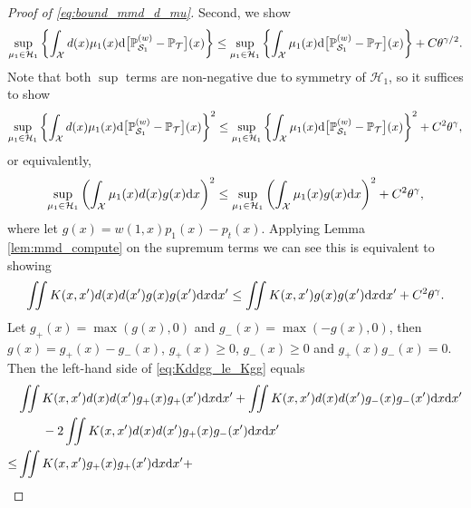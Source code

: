 \documentclass[12pt]{article}
\newcommand{\prob}{\mathbb{P}}
\begin{document}
\begin{proof}[Proof of \eqref{eq:bound_mmd_d_mu}]
	Second, we show 
	{\small
		\begin{equation}
			\label{eq:dmu_le_mu_population}
			\sup_{\mu_1 \in \mathcal{H}_1}
			\left\{ \int_\mathcal{X} d(x) \mu_1(x) \textnormal{d} \big[\prob_{\mathcal{S}_1}^{(w)} - \prob_{\mathcal{T}}\big](x) \right\}
			\le
			\sup_{\mu_1 \in \mathcal{H}_1}
			\left\{ \int_\mathcal{X} \mu_1(x) \textnormal{d} \big[\prob_{\mathcal{S}_1}^{(w)} - \prob_{\mathcal{T}}\big](x) \right\} + C \theta^{\gamma/2}
			.\end{equation}
	}%
	Note that both $\sup$ terms are non-negative due to symmetry of $\mathcal{H}_1$, so it suffices to show
	\begin{equation*}
		\sup_{\mu_1 \in \mathcal{H}_1}
		\left\{ \int_\mathcal{X} d(x) \mu_1(x) \textnormal{d} \big[\prob_{\mathcal{S}_1}^{(w)} - \prob_{\mathcal{T}}\big](x) \right\}^2
		\le
		\sup_{\mu_1 \in \mathcal{H}_1}
		\left\{ \int_\mathcal{X} \mu_1(x) \textnormal{d} \big[\prob_{\mathcal{S}_1}^{(w)} - \prob_{\mathcal{T}}\big](x) \right\}^2 + C^2 \theta^{\gamma}
		,\end{equation*}
	or equivalently,
	\begin{equation*}
		\sup_{\mu_1 \in \mathcal{H}_1}
		\left( \int_\mathcal{X} \mu_1(x) d(x) g(x) \textnormal{d} x \right)^2
		\le
		\sup_{\mu_1 \in \mathcal{H}_1}
		\left( \int_\mathcal{X} \mu_1(x) g(x) \textnormal{d} x \right)^2 + C^2 \theta^{\gamma}
		,\end{equation*}
	where let $g(x) = w(1,x)p_1(x) - p_t(x)$.
	Applying Lemma \ref{lem:mmd_compute} on the supremum terms we can see this is equivalent to showing
	\begin{equation}
		\label{eq:Kddgg_le_Kgg}
		\iint K(x, x') d(x) d(x') g(x) g(x') \textnormal{d} x \textnormal{d} x'
		\le
		\iint K(x, x') g(x) g(x') \textnormal{d} x \textnormal{d} x' + C^2 \theta^{\gamma}
		.\end{equation}
	Let $g_+(x) = \max(g(x), 0)$ and $g_-(x) = \max(-g(x), 0)$, then $g(x) = g_+(x) - g_-(x)$, $g_+(x) \ge 0$, $g_-(x) \ge 0$ and $g_+(x) g_-(x) = 0$. Then the left-hand side of \eqref{eq:Kddgg_le_Kgg} equals
	\begin{align*}
		&\iint K(x, x') d(x) d(x') g_+(x) g_+(x') \textnormal{d} x \textnormal{d} x' +
		\iint K(x, x') d(x) d(x') g_-(x) g_-(x') \textnormal{d} x \textnormal{d} x' \\
		&\qquad - 2 \iint K(x, x') d(x) d(x') g_+(x) g_-(x') \textnormal{d} x \textnormal{d} x'
		\\ \le &
		\iint K(x, x') g_+(x) g_+(x') \textnormal{d} x \textnormal{d} x' +

\end{align*}
\end{proof}
\end{document}
